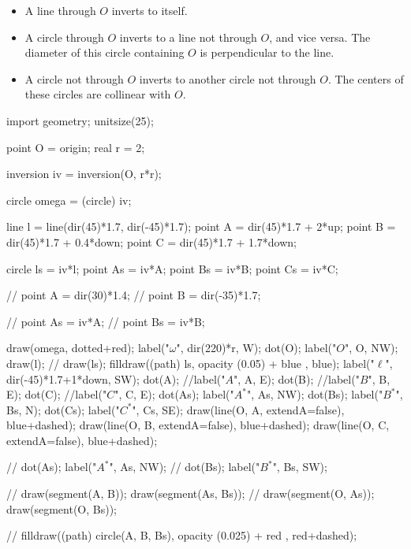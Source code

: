 \documentclass[]{scrartcl}
\begin{document}
\begin{itemize}
	\item A line through $O$ inverts to itself.
	\item A circle through $O$ inverts to a line not through $O$, and vice versa. The diameter of this circle containing $O$ is perpendicular to the line.
	\item A circle not through $O$ inverts to another circle not through $O$. The centers of these circles are collinear with $O$.
\end{itemize} 
\begin{minipage}{.5\textwidth}
	\begin{center}
		\begin{asy}
		import geometry;
		unitsize(25);
	
		point O = origin;
		real r = 2;
	
		inversion iv = inversion(O, r*r);
	
		circle omega = (circle) iv;
	
		line l = line(dir(45)*1.7, dir(-45)*1.7);
		point A = dir(45)*1.7 + 2*up;
		point B = dir(45)*1.7 + 0.4*down;
		point C = dir(45)*1.7 + 1.7*down;

		circle ls = iv*l;
		point As = iv*A;
		point Bs = iv*B;
		point Cs = iv*C;


		// point A = dir(30)*1.4;
		// point B = dir(-35)*1.7;
	
		// point As = iv*A;
		// point Bs = iv*B;
	
		
		draw(omega, dotted+red);
		label("$\omega$", dir(220)*r, W);
		dot(O); label("$O$", O, NW);
		draw(l);
		// draw(ls);
		filldraw((path) ls, opacity (0.05) + blue , blue);
		label("$\ell$", dir(-45)*1.7+1*down, SW);
		dot(A); //label("$A$", A, E);
		dot(B); //label("$B$", B, E);
		dot(C); //label("$C$", C, E);
		dot(As); label("$A^*$", As, NW);
		dot(Bs); label("$B^*$", Bs, N);
		dot(Cs); label("$C^*$", Cs, SE);
		draw(line(O, A, extendA=false), blue+dashed);
		draw(line(O, B, extendA=false), blue+dashed);
		draw(line(O, C, extendA=false), blue+dashed);
	
		// dot(As); label("$A^*$", As, NW);
		// dot(Bs); label("$B^*$", Bs, SW);
	
		// draw(segment(A, B)); draw(segment(As, Bs));
		// draw(segment(O, As)); draw(segment(O, Bs));
	
		// filldraw((path) circle(A, B, Bs), opacity (0.025) + red , red+dashed);
		\end{asy}
	\end{center}
\end{minipage}
\end{document}
